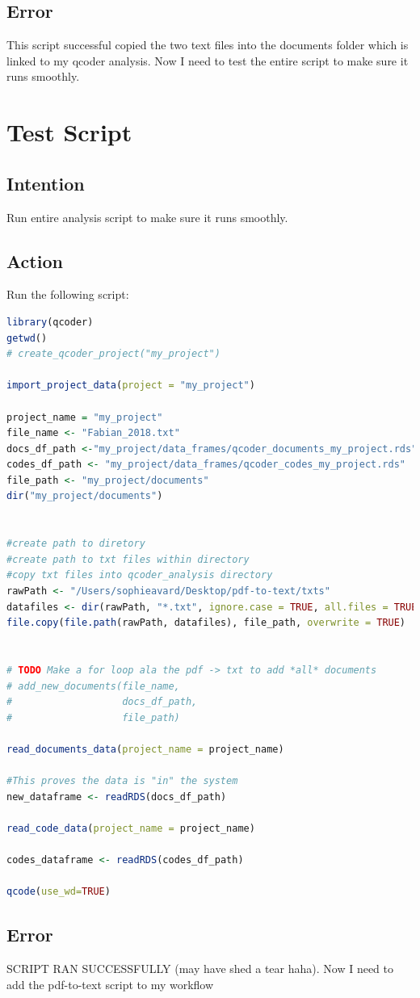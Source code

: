 \documentclass{article}
\begin{document}
\subsection{Error}
This script successful copied the two text files into the documents folder which is linked to my qcoder analysis. Now I need to test the entire script to make sure it runs smoothly. 

\section{Test Script}
\subsection{Intention}
Run entire analysis script to make sure it runs smoothly.

\subsection{Action}
Run the following script:
\begin{lstlisting}[language=R]
library(qcoder)
getwd()
# create_qcoder_project("my_project")

import_project_data(project = "my_project")

project_name = "my_project"
file_name <- "Fabian_2018.txt"
docs_df_path <-"my_project/data_frames/qcoder_documents_my_project.rds"
codes_df_path <- "my_project/data_frames/qcoder_codes_my_project.rds"
file_path <- "my_project/documents"
dir("my_project/documents")


#create path to diretory
#create path to txt files within directory
#copy txt files into qcoder_analysis directory
rawPath <- "/Users/sophieavard/Desktop/pdf-to-text/txts"
datafiles <- dir(rawPath, "*.txt", ignore.case = TRUE, all.files = TRUE)
file.copy(file.path(rawPath, datafiles), file_path, overwrite = TRUE)


# TODO Make a for loop ala the pdf -> txt to add *all* documents
# add_new_documents(file_name,
#                   docs_df_path,
#                   file_path)

read_documents_data(project_name = project_name)

#This proves the data is "in" the system
new_dataframe <- readRDS(docs_df_path)

read_code_data(project_name = project_name)

codes_dataframe <- readRDS(codes_df_path)

qcode(use_wd=TRUE)
\end{lstlisting}

\subsection{Error}
SCRIPT RAN SUCCESSFULLY (may have shed a tear haha).
Now I need to add the pdf-to-text script to my workflow
\end{document}
